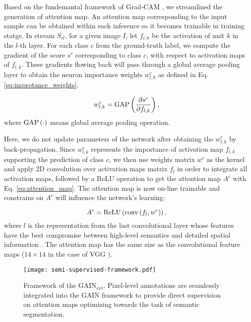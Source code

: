 \documentclass[10pt,twocolumn,letterpaper]{article}
\begin{document}
Based on the fundemantal framework of Grad-CAM \cite{grad-cam}, we streamlined the generation of attention map.  An attention map corresponding to the input sample can be obtained within each inference so it becomes trainable in training statge. In stream ${S_{cl}}$, for a given image $I$, let $f_{l,k}$ be the activation of unit $k$ in the $l$-th layer. For each class $c$ from the ground-truth label, we compute the gradient of the score $s^c$ corresponding to class $c$, with respect to activation maps of $f_{l,k}$. These gradients flowing back will pass through a global average pooling layer \cite{lin2013network} to obtain the neuron importance weights $w_{l,k}^c$ as defined in Eq. \ref{eq:improtance_weights}.



\begin{equation}
\label{eq:improtance_weights}
w_{l,k}^c = {\mathop{\rm GAP}\nolimits}\left( {\frac{{\partial {s^c}}}{{\partial {f_{l,k}}}}} \right),
\end{equation}
where ${\mathop{\rm GAP}\nolimits} \left(  \cdot  \right)$ means global average pooling operation.


Here, we do not update parameters of the network after obtaining the $w_{l,k}^c$ by back-propagation. Since $w_{l,k}^c$ represents the importance of activation map $f_{l,k}$ supporting the prediction of class $c$, we then use weights matrix $w^c$ as the kernel and apply 2D convolution over activation maps matrix $f_{l}$ in order to integrate all activation maps, followed by a ReLU operation to get the attention map $A^c$ with Eq. \ref{eq:attention_map}. The attention map is now on-line trainable and constrains on $A^c$ will influence the network's learning:


\begin{equation}
\label{eq:attention_map}
{A^c} = {\mathop{\rm ReLU}\nolimits} \left( {{\mathop{\rm conv}\nolimits} \left( {{f_l},{w^c}} \right)} \right),
\end{equation}
where $l$ is the representation from the last convolutional layer whose features have the best compromise between high-level semantics and detailed spatial information \cite{simonyan2013deep}. The attention map has the same size as the convolutional feature maps ($14 \times 14$ in the case of VGG \cite{simonyan2014very}).


\begin{figure*}%
\centering
\texttt{[image: semi-supervised-framework.pdf]} %
\caption{Framework of the GAIN$_{ext}$. Pixel-level annotations are seamlessly integrated into the GAIN framework to provide direct supervision on attention maps optimizing towards the task of semantic segmentation.}
\label{fig:human_supervised}
\end{figure*}
\end{document}

